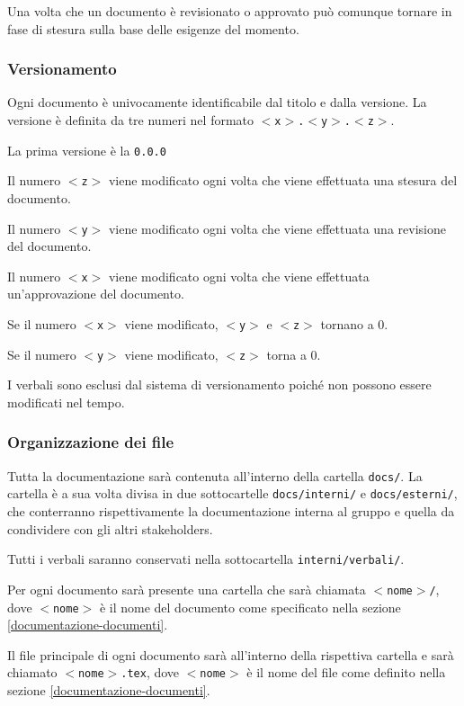 \documentclass[a4paper, 12pt]{article}
\begin{document}
Una volta che un documento è revisionato o approvato può comunque tornare in fase di stesura sulla base delle esigenze del momento.

\subsubsection{Versionamento}
Ogni documento è univocamente identificabile dal titolo e dalla versione. La versione è definita da tre numeri nel formato \texttt{$<$x$>$.$<$y$>$.$<$z$>$}.

La prima versione è la \texttt{0.0.0}

Il numero \texttt{$<$z$>$} viene modificato ogni volta che viene effettuata una stesura del documento.

Il numero \texttt{$<$y$>$} viene modificato ogni volta che viene effettuata una revisione del documento.

Il numero \texttt{$<$x$>$} viene modificato ogni volta che viene effettuata un'approvazione del documento.

Se il numero \texttt{$<$x$>$} viene modificato, \texttt{$<$y$>$} e \texttt{$<$z$>$} tornano a 0.

Se il numero \texttt{$<$y$>$} viene modificato, \texttt{$<$z$>$} torna a 0.

I verbali sono esclusi dal sistema di versionamento poiché non possono essere modificati nel tempo.

\subsubsection{Organizzazione dei file}
Tutta la documentazione sarà contenuta all'interno della cartella \texttt{docs/}. La cartella è a sua volta divisa in due sottocartelle \texttt{docs/interni/} e \texttt{docs/esterni/}, che conterranno rispettivamente la documentazione interna al gruppo e quella da condividere con gli altri stakeholders.

Tutti i verbali saranno conservati nella sottocartella \texttt{interni/verbali/}.

Per ogni documento sarà presente una cartella che sarà chiamata \texttt{$<$nome$>$/}, dove \texttt{$<$nome$>$} è il nome del documento come specificato nella sezione \ref{documentazione-documenti}.

Il file principale di ogni documento sarà all'interno della rispettiva cartella e sarà chiamato \texttt{$<$nome$>$.tex}, dove \texttt{$<$nome$>$} è il nome del file come definito nella sezione \ref{documentazione-documenti}.
\end{document}
